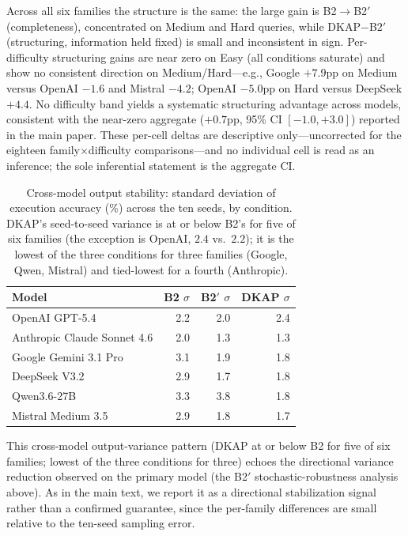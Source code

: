 \documentclass[10pt,a4paper]{article}
\begin{document}
Across all six families the structure is the same: the large gain is B2$\to$B2$'$ (completeness), concentrated on Medium and Hard queries, while DKAP$-$B2$'$ (structuring, information held fixed) is small and inconsistent in sign. Per-difficulty structuring gains are near zero on Easy (all conditions saturate) and show no consistent direction on Medium/Hard---e.g., Google $+7.9$pp on Medium versus OpenAI $-1.6$ and Mistral $-4.2$; OpenAI $-5.0$pp on Hard versus DeepSeek $+4.4$. No difficulty band yields a systematic structuring advantage across models, consistent with the near-zero aggregate ($+0.7$pp, 95\% CI $[-1.0,+3.0]$) reported in the main paper. These per-cell deltas are descriptive only---uncorrected for the eighteen family$\times$difficulty comparisons---and no individual cell is read as an inference; the sole inferential statement is the aggregate CI.

\begin{table}[h]
\centering
\caption{Cross-model output stability: standard deviation of execution accuracy (\%) across the ten seeds, by condition. DKAP's seed-to-seed variance is at or below B2's for five of six families (the exception is OpenAI, $2.4$ vs.\ $2.2$); it is the lowest of the three conditions for three families (Google, Qwen, Mistral) and tied-lowest for a fourth (Anthropic).}
\label{tab:crossmodel_var}
\footnotesize
\begin{tabular}{@{}lrrr@{}}
\toprule
Model & B2 $\sigma$ & B2$'$ $\sigma$ & DKAP $\sigma$ \\
\midrule
OpenAI GPT-5.4 & 2.2 & 2.0 & 2.4 \\
Anthropic Claude Sonnet 4.6 & 2.0 & 1.3 & 1.3 \\
Google Gemini 3.1 Pro & 3.1 & 1.9 & 1.8 \\
DeepSeek V3.2 & 2.9 & 1.7 & 1.8 \\
Qwen3.6-27B & 3.3 & 3.8 & 1.8 \\
Mistral Medium 3.5 & 2.9 & 1.8 & 1.7 \\
\bottomrule
\end{tabular}
\end{table}

This cross-model output-variance pattern (DKAP at or below B2 for five of six families; lowest of the three conditions for three) echoes the directional variance reduction observed on the primary model (the B2$'$ stochastic-robustness analysis above). As in the main text, we report it as a directional stabilization signal rather than a confirmed guarantee, since the per-family differences are small relative to the ten-seed sampling error.
\end{document}

